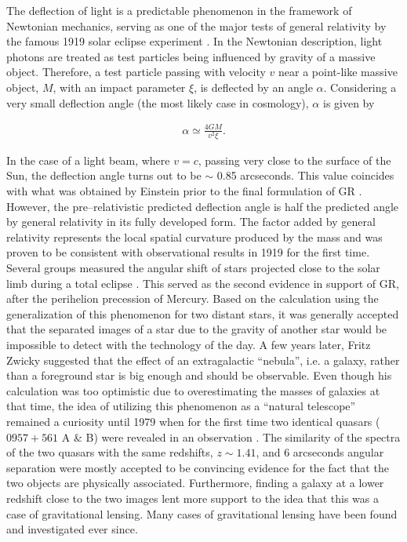 \documentclass[a4wide,12pt]{book}
\begin{document}
{The deflection of light is a predictable phenomenon in the framework of Newtonian mechanics, serving as one of the major tests of general relativity by the famous 1919 solar eclipse experiment \citep[][]{Eddington1919}. In the Newtonian description, light photons are treated as test particles being influenced by gravity of a massive object. Therefore, a test particle passing with velocity $v$ near a point-like massive object, $M$, with an impact parameter $\xi$, is deflected by an angle $\alpha$. Considering a very small deflection angle (the most likely case in cosmology), $\alpha$ is given by

\begin{eqnarray}
\label{eq:alpha}
\alpha \simeq \frac{4GM}{v^2 \xi}.
\end{eqnarray}

In the case of a light beam, where $v = c$, passing very close to the surface of the Sun, the deflection angle turns out to be $\sim$ 0.85 arcseconds. This value coincides with what was obtained by Einstein prior to the final formulation of GR \citep[][in German!]{Einstein1911}. However, the pre--relativistic predicted deflection angle is half the predicted angle by general relativity in its fully developed form. The factor added by general relativity represents the local spatial curvature produced by the mass and was proven to be consistent with observational results in 1919 for the first time. Several groups measured the angular shift of stars projected close to the solar limb during a total eclipse \citet{Eddington1919}. This served as the second evidence in support of GR, after the perihelion precession of Mercury. Based on the calculation using the generalization of this phenomenon for two distant stars, it was generally accepted that the separated images of a star due to the gravity of another star would be impossible to detect with the technology of the day. A few years later, Fritz Zwicky suggested  \citep{Zwicky1937} that the effect of an extragalactic ``nebula'', i.e. a galaxy, rather than a foreground star is big enough and should be observable. Even though his calculation was too optimistic due to overestimating the masses of galaxies at that time, the idea of utilizing this phenomenon as a ``natural telescope''  remained a curiosity until 1979 when for the first time two identical quasars ($0957+561$ A \& B) were revealed in an observation \citep{Walsh+1979}. The similarity of the spectra of the two quasars with the same redshifts, $z \sim 1.41$, and 6 arcseconds angular separation were mostly accepted to be convincing evidence for the fact that the two objects are physically associated. Furthermore, finding a galaxy at a lower redshift close to the two images lent more support to the idea that this was a case of gravitational lensing. Many cases of gravitational lensing have been found and investigated ever since.

}
\end{document}
